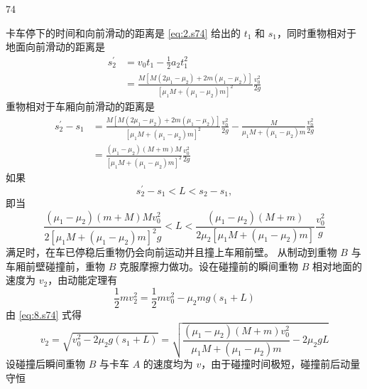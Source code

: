\begin{solution}{74}
\begin{subsolution}
        \begin{subsubsolution}
            卡车停下的时间和向前滑动的距离是 \eqref{eq:2.s74} 给出的 $t_{1}$ 和 $s_{1}$，同时重物相对于地面向前滑动的距离是
            \begin{align}
                s_{2}^{\prime} &= v_{0} t_{1} - \frac{1}{2} a_{2} t_{1}^{2} \nonumber \\
                &= \frac{M [M(2 \mu_{1} - \mu_{2}) + 2 m (\mu_{1} - \mu_{2})]}{[\mu_{1} M + (\mu_{1} - \mu_{2}) m]^{2}} \frac{v_{0}^{2}}{2 g}
                \label{eq:7.s74}
            \end{align}
            重物相对于车厢向前滑动的距离是
            \begin{align}
                s_{2}^{\prime} - s_{1} &= \frac{M [M(2 \mu_{1} - \mu_{2}) + 2 m (\mu_{1} - \mu_{2})]}{[\mu_{1} M + (\mu_{1} - \mu_{2}) m]^{2}} \frac{v_{0}^{2}}{2 g} - \frac{M}{\mu_{1} M + (\mu_{1} - \mu_{2}) m} \frac{v_{0}^{2}}{2 g} \nonumber \\
                &= \frac{(\mu_{1} - \mu_{2})(M + m) M}{[\mu_{1} M + (\mu_{1} - \mu_{2}) m]^{2}} \frac{v_{0}^{2}}{2 g}
            \end{align}
            如果
            \begin{equation}
                s_{2}^{\prime} - s_{1} < L < s_{2} - s_{1},
            \end{equation}
            即当
            \begin{equation}
                \frac{(\mu_{1} - \mu_{2})(m + M) M v_{0}^{2}}{2 [\mu_{1} M + (\mu_{1} - \mu_{2}) m]^{2} g} < L < \frac{(\mu_{1} - \mu_{2})(M + m)}{2 \mu_{2} [\mu_{1} M + (\mu_{1} - \mu_{2}) m]} \frac{v_{0}^{2}}{g}
            \end{equation}
            满足时，在车已停稳后重物仍会向前运动并且撞上车厢前壁。
            从制动到重物 $B$ 与车厢前壁碰撞前，重物 $B$ 克服摩擦力做功。设在碰撞前的瞬间重物 $B$ 相对地面的速度为 $v_{2}$，由动能定理有
            \begin{equation}
                \frac{1}{2} m v_{2}^{2} = \frac{1}{2} m v_{0}^{2} - \mu_{2} m g (s_{1} + L)
                \label{eq:8.s74}
            \end{equation}
            由 \eqref{eq:8.s74} 式得
            \begin{equation}
                v_{2} = \sqrt{v_{0}^{2} - 2 \mu_{2} g (s_{1} + L)} = \sqrt{\frac{(\mu_{1} - \mu_{2})(M + m) v_{0}^{2}}{\mu_{1} M + (\mu_{1} - \mu_{2}) m} - 2 \mu_{2} g L}
            \end{equation}
            设碰撞后瞬间重物 $B$ 与卡车 $A$ 的速度均为 $v$，由于碰撞时间极短，碰撞前后动量守恒

\end{subsubsolution}
\end{subsolution}
\end{solution}
